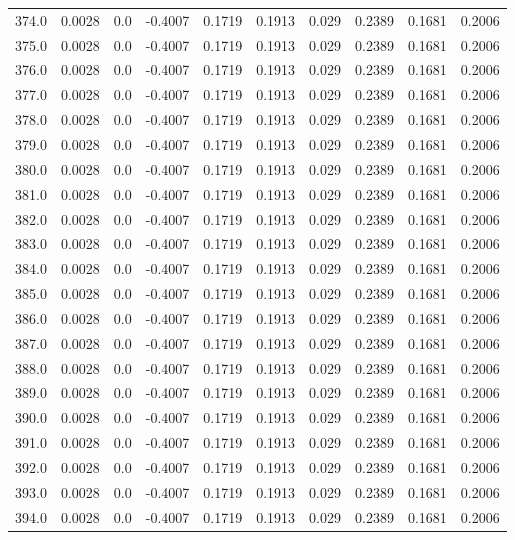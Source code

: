 \begin{longtable}{lrrrrrrrrr}
374.0 & 0.0028 & 0.0 & -0.4007 & 0.1719 & 0.1913 & 0.029 & 0.2389 & 0.1681 & 0.2006 \\
375.0 & 0.0028 & 0.0 & -0.4007 & 0.1719 & 0.1913 & 0.029 & 0.2389 & 0.1681 & 0.2006 \\
376.0 & 0.0028 & 0.0 & -0.4007 & 0.1719 & 0.1913 & 0.029 & 0.2389 & 0.1681 & 0.2006 \\
377.0 & 0.0028 & 0.0 & -0.4007 & 0.1719 & 0.1913 & 0.029 & 0.2389 & 0.1681 & 0.2006 \\
378.0 & 0.0028 & 0.0 & -0.4007 & 0.1719 & 0.1913 & 0.029 & 0.2389 & 0.1681 & 0.2006 \\
379.0 & 0.0028 & 0.0 & -0.4007 & 0.1719 & 0.1913 & 0.029 & 0.2389 & 0.1681 & 0.2006 \\
380.0 & 0.0028 & 0.0 & -0.4007 & 0.1719 & 0.1913 & 0.029 & 0.2389 & 0.1681 & 0.2006 \\
381.0 & 0.0028 & 0.0 & -0.4007 & 0.1719 & 0.1913 & 0.029 & 0.2389 & 0.1681 & 0.2006 \\
382.0 & 0.0028 & 0.0 & -0.4007 & 0.1719 & 0.1913 & 0.029 & 0.2389 & 0.1681 & 0.2006 \\
383.0 & 0.0028 & 0.0 & -0.4007 & 0.1719 & 0.1913 & 0.029 & 0.2389 & 0.1681 & 0.2006 \\
384.0 & 0.0028 & 0.0 & -0.4007 & 0.1719 & 0.1913 & 0.029 & 0.2389 & 0.1681 & 0.2006 \\
385.0 & 0.0028 & 0.0 & -0.4007 & 0.1719 & 0.1913 & 0.029 & 0.2389 & 0.1681 & 0.2006 \\
386.0 & 0.0028 & 0.0 & -0.4007 & 0.1719 & 0.1913 & 0.029 & 0.2389 & 0.1681 & 0.2006 \\
387.0 & 0.0028 & 0.0 & -0.4007 & 0.1719 & 0.1913 & 0.029 & 0.2389 & 0.1681 & 0.2006 \\
388.0 & 0.0028 & 0.0 & -0.4007 & 0.1719 & 0.1913 & 0.029 & 0.2389 & 0.1681 & 0.2006 \\
389.0 & 0.0028 & 0.0 & -0.4007 & 0.1719 & 0.1913 & 0.029 & 0.2389 & 0.1681 & 0.2006 \\
390.0 & 0.0028 & 0.0 & -0.4007 & 0.1719 & 0.1913 & 0.029 & 0.2389 & 0.1681 & 0.2006 \\
391.0 & 0.0028 & 0.0 & -0.4007 & 0.1719 & 0.1913 & 0.029 & 0.2389 & 0.1681 & 0.2006 \\
392.0 & 0.0028 & 0.0 & -0.4007 & 0.1719 & 0.1913 & 0.029 & 0.2389 & 0.1681 & 0.2006 \\
393.0 & 0.0028 & 0.0 & -0.4007 & 0.1719 & 0.1913 & 0.029 & 0.2389 & 0.1681 & 0.2006 \\
394.0 & 0.0028 & 0.0 & -0.4007 & 0.1719 & 0.1913 & 0.029 & 0.2389 & 0.1681 & 0.2006 \\

\end{longtable}
